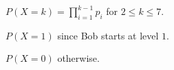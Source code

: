 $P(X=k) = \prod_{i=1}^{k-1}p_{i}$ for $2 \leq k \leq 7.$

$P(X=1)$ since Bob starts at level $1$.

$P(X=0)$ otherwise. 
